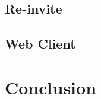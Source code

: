 \subsection{Re-invite}
\label{sec:Solution:ThirdPartyCall:Re-invite}

\subsection{Web Client}
\label{sec:Solution:ThirdPartyCall:WebClient}


\section{Conclusion}
\label{sec:Solution:Conclusion}




